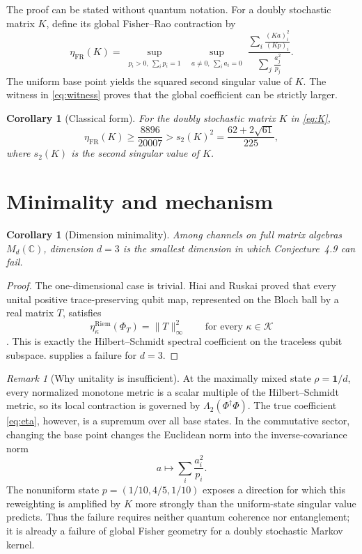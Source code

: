 \documentclass[11pt]{amsart}
\newtheorem{corollary}[theorem]{Corollary}
\theoremstyle{definition}
\theoremstyle{remark}
\newtheorem{remark}[theorem]{Remark}
\newcommand{\Id}{\mathbf 1}
\newcommand{\Riem}{\mathrm{Riem}}
\begin{document}
The proof can be stated without quantum notation. For a doubly stochastic matrix $K$, define its global Fisher--Rao contraction by
\begin{equation}\label{eq:classicaleta}
 \eta_{\mathrm{FR}}(K)
 =\sup_{\substack{p_i>0,\ \sum_i p_i=1}}
  \sup_{\substack{a\ne0,\ \sum_i a_i=0}}
 \frac{\displaystyle\sum_i\frac{(Ka)_i^2}{(Kp)_i}}
      {\displaystyle\sum_j\frac{a_j^2}{p_j}}.
\end{equation}
The uniform base point yields the squared second singular value of $K$. The witness in \eqref{eq:witness} proves that the global coefficient can be strictly larger.

\begin{corollary}[Classical form]\label{cor:classical}
For the doubly stochastic matrix $K$ in \eqref{eq:K},
\[
 \eta_{\mathrm{FR}}(K)
 \ge \frac{8896}{20007}
 >s_2(K)^2
 =\frac{62+2\sqrt{61}}{225},
\]
where $s_2(K)$ is the second singular value of $K$.
\end{corollary}

\section{Minimality and mechanism}

\begin{corollary}[Dimension minimality]\label{cor:minimal}
Among channels on full matrix algebras $M_d(\mathbb C)$, dimension $d=3$ is the smallest dimension in which Conjecture~4.9 can fail.
\end{corollary}

\begin{proof}
The one-dimensional case is trivial. Hiai and Ruskai proved that every unital positive trace-preserving qubit map, represented on the Bloch ball by a real matrix $T$, satisfies
\[
 \eta_\kappa^{\Riem}(\Phi_T)=\|T\|_\infty^2
 \qquad\text{for every }\kappa\in\mathcal K
\]
\cite[Theorem~6.1]{HR2016}. This is exactly the Hilbert--Schmidt spectral coefficient on the traceless qubit subspace.  supplies a failure for $d=3$.
\end{proof}

\begin{remark}[Why unitality is insufficient]
At the maximally mixed state $\rho=\Id/d$, every normalized monotone metric is a scalar multiple of the Hilbert--Schmidt metric, so its local contraction is governed by $\Lambda_2(\Phi^\dagger\Phi)$. The true coefficient \eqref{eq:eta}, however, is a supremum over all base states. In the commutative sector, changing the base point changes the Euclidean norm into the inverse-covariance norm
\[
 a\longmapsto \sum_i\frac{a_i^2}{p_i}.
\]
The nonuniform state $p=(1/10,4/5,1/10)$ exposes a direction for which this reweighting is amplified by $K$ more strongly than the uniform-state singular value predicts. Thus the failure requires neither quantum coherence nor entanglement; it is already a failure of global Fisher geometry for a doubly stochastic Markov kernel.
\end{remark}
\end{document}
